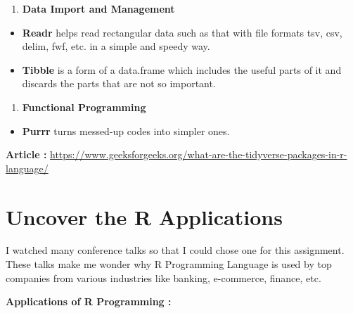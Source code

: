 \documentclass[
  letterpaper,
  DIV=11,
  numbers=noendperiod]{scrreprt}
\providecommand{\tightlist}{%
  \setlength{\itemsep}{0pt}\setlength{\parskip}{0pt}}\usepackage{longtable,booktabs,array}
\begin{document}
\begin{enumerate}
\def\labelenumi{\arabic{enumi}.}
\setcounter{enumi}{2}
\tightlist
\item
  \textbf{Data Import and Management}
\end{enumerate}

\begin{itemize}
\item
  \textbf{Readr} helps read rectangular data such as that with file
  formats tsv, csv, delim, fwf, etc. in a simple and speedy way.
\item
  \textbf{Tibble} is a form of a data.frame which includes the useful
  parts of it and discards the parts that are not so important.
\end{itemize}

\begin{enumerate}
\def\labelenumi{\arabic{enumi}.}
\setcounter{enumi}{3}
\tightlist
\item
  \textbf{Functional Programming}
\end{enumerate}

\begin{itemize}
\tightlist
\item
  \textbf{Purrr} turns messed-up codes into simpler ones.
\end{itemize}

\textbf{Article :}
\url{https://www.geeksforgeeks.org/what-are-the-tidyverse-packages-in-r-language/}

\hypertarget{uncover-the-r-applications}{%
\section{Uncover the R Applications}\label{uncover-the-r-applications}}

I watched many conference talks so that I could chose one for this
assignment. These talks make me wonder why R Programming Language is
used by top companies from various industries like banking, e-commerce,
finance, etc.

\textbf{Applications of R Programming :}
\end{document}
